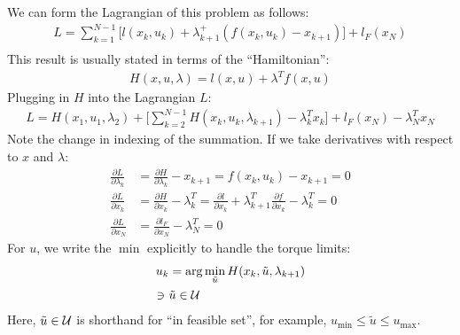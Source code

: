 \noindent
We can form the Lagrangian of this problem as follows: 
\begin{align}
    L = \sum_{k=1}^{N-1} \Big[ l(x_k,u_k) + \lambda_{k+1}^+ (f(x_k,u_k)-x_{k+1}) \Big] + l_F(x_N) \\
\end{align}
This result is usually stated in terms of the ``Hamiltonian'': 
\begin{align}
    H(x, u, \lambda) = l(x,u) + \lambda^T f(x,u)
\end{align}
Plugging in $H$ into the Lagrangian $L$:
\begin{align}
    L = H(x_1, u_1, \lambda_2) + \Big[ \sum_{k=2}^{N-1} H(x_k,u_k,\lambda_{k+1}) - \lambda_k^T x_k \Big] + l_F(x_N) - \lambda_N^T x_N 
\end{align}
Note the change in indexing of the summation.
If we take derivatives with respect to $x$ and $\lambda$: 
\begin{align}
    \frac{\partial L}{\partial \lambda_k} &= \frac{\partial H}{\partial \lambda_k} - x_{k+1} = f(x_k,u_k) - x_{k+1} = 0 \\
    \frac{\partial L}{\partial x_k} &= \frac{\partial H}{\partial x_k} - \lambda_{k}^T = \frac{\partial l}{\partial x_k} + \lambda_{k+1}^T \frac{\partial f}{\partial x_k} - \lambda_k^T = 0 \\
    \frac{\partial L}{\partial x_N} &= \frac{\partial l_F}{\partial x_N} - \lambda_N^T = 0
\end{align}
For $u$, we write the $\min$ explicitly to handle the torque limits:
\begin{align}
    u_k &= \arg\min_{\Tilde{u}} H(x_k, \Tilde{u}, \lambda_{k+1}) \\
    \ni \ & \Tilde{u}  \in \mathcal{U} 
\end{align}
Here, $\Tilde{u} \in \mathcal{U}$ is shorthand for ``in feasible set'', for example, $u_{\min} \leq \tilde{u} \leq u_{\max}$.\\

